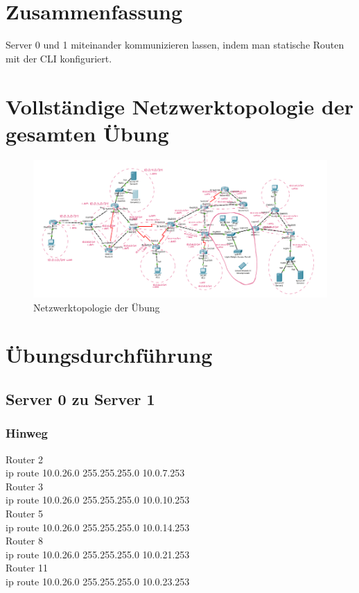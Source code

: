 \documentclass[a4paper]{article}
\begin{document}
\section{Zusammenfassung}
Server 0 und 1 miteinander kommunizieren lassen, indem man statische Routen mit der CLI konfiguriert.


\newpage

\section{Vollständige Netzwerktopologie der gesamten Übung}

\begin{figure}[h]
	\includegraphics[scale=0.5]{topologie.png}
	\caption{Netzwerktopologie der Übung}
\end{figure}

\newpage

\section{Übungsdurchführung}
\subsection{Server 0 zu Server 1}

\subsubsection{Hinweg}
Router 2\\
ip route 10.0.26.0 255.255.255.0 10.0.7.253 \\
Router 3\\
ip route 10.0.26.0 255.255.255.0 10.0.10.253\\
Router 5\\
ip route 10.0.26.0 255.255.255.0 10.0.14.253\\
Router 8\\
ip route 10.0.26.0 255.255.255.0 10.0.21.253\\
Router 11\\
ip route 10.0.26.0 255.255.255.0 10.0.23.253\\
\end{document}
